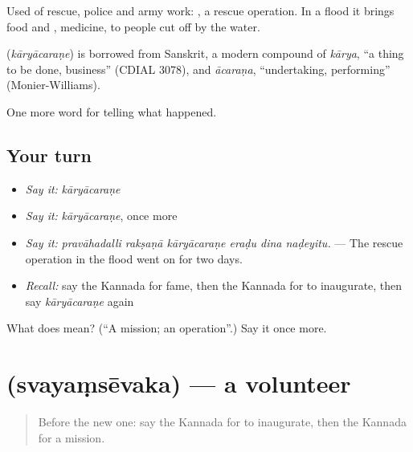 Used of rescue, police and army work:  , a rescue operation. In a flood it brings food and , medicine, to people cut off by the water.

\begin{cousinweb}
\textbf{} (\emph{kāryācaraṇe}) is borrowed from Sanskrit, a modern compound of \emph{kārya}, \textquotedblleft{}a thing to be done, business\textquotedblright{} (CDIAL 3078), and \emph{ācaraṇa}, \textquotedblleft{}undertaking, performing\textquotedblright{} (Monier-Williams).
\end{cousinweb}

\begin{grammarlens}[title={What you've built}]
One more word for telling what happened.
\end{grammarlens}

\subsection*{Your turn}
\begin{itemize}
\raggedright
  \item \emph{Say it:} \emph{kāryācaraṇe}
  \item \emph{Say it:} \emph{kāryācaraṇe}, once more
  \item \emph{Say it:} \emph{pravāhadalli rakṣaṇā kāryācaraṇe eraḍu dina naḍeyitu.} — The rescue operation in the flood went on for two days.
  \item \emph{Recall:} say the Kannada for fame, then the Kannada for to inaugurate, then say \emph{kāryācaraṇe} again
\end{itemize}

\begin{tcolorbox}[breakable,colback=teal!4,colframe=teal!35!black,title={Before you move on}]
What does  mean? (\textquotedblleft{}A mission; an operation\textquotedblright{}.) Say it once more.
\end{tcolorbox}
\section[\texorpdfstring{\kn{ಸ್ವಯಂಸೇವಕ} (svayaṃsēvaka)}{ಸ್ವಯಂಸೇವಕ (svayaṃsēvaka)}]{ (svayaṃsēvaka) — a volunteer}

\label{lesson:KA-C351-svayamsevaka}



\begin{quote}
Before the new one: say the Kannada for to inaugurate, then the Kannada for a mission.
\end{quote}

